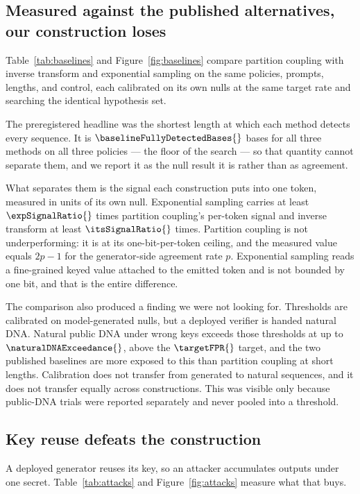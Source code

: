 \subsection{Measured against the published alternatives, our construction loses}

Table~\ref{tab:baselines} and Figure~\ref{fig:baselines} compare partition coupling with inverse
transform and exponential sampling on the same policies, prompts, lengths, and control, each
calibrated on its own nulls at the same target rate and searching the identical hypothesis set.

The preregistered headline was the shortest length at which each method detects every sequence. It is
$\baselineFullyDetectedBases{}$ bases for all three methods on all three policies --- the floor of the
search --- so that quantity cannot separate them, and we report it as the null result it is rather than
as agreement.

What separates them is the signal each construction puts into one token, measured in units of its own
null. Exponential sampling carries at least $\expSignalRatio{}$ times partition coupling's per-token
signal and inverse transform at least $\itsSignalRatio{}$ times. Partition coupling is not
underperforming: it is at its one-bit-per-token ceiling, and the measured value equals $2p-1$ for the
generator-side agreement rate $p$. Exponential sampling reads a fine-grained keyed value attached to
the emitted token and is not bounded by one bit, and that is the entire difference.



The comparison also produced a finding we were not looking for. Thresholds are calibrated on
model-generated nulls, but a deployed verifier is handed natural DNA. Natural public DNA under wrong
keys exceeds those thresholds at up to $\naturalDNAExceedance{}$, above the $\targetFPR{}$ target, and
the two published baselines are more exposed to this than partition coupling at short lengths.
Calibration does not transfer from generated to natural sequences, and it does not transfer equally
across constructions. This was visible only because public-DNA trials were reported separately and
never pooled into a threshold.

\subsection{Key reuse defeats the construction}

A deployed generator reuses its key, so an attacker accumulates outputs under one secret.
Table~\ref{tab:attacks} and Figure~\ref{fig:attacks} measure what that buys.

